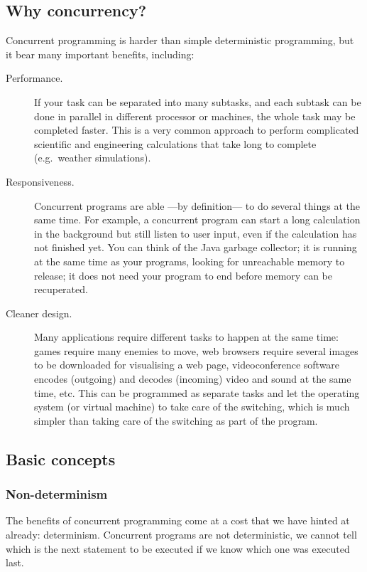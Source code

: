 \subsection{Why concurrency?}
\label{sec:why-concurrency}

Concurrent programming is harder than simple deterministic
programming, but it bear many important benefits, including: 

\begin{description}
\item[Performance. ] If your task can be separated into many subtasks,
  and each subtask can be done in parallel in different processor or
  machines, the whole task may be completed faster. This is a very
  common approach to perform complicated scientific and engineering
  calculations that take long to complete (e.g.~weather simulations).
\item[Responsiveness. ] Concurrent programs are able ---by
  definition--- to do several things at the same time. For example, a
  concurrent program can start a long calculation in the background
  but still listen to user input, even if the calculation has not
  finished yet. You can think of the Java garbage collector; it is
  running at the same time as your programs, looking for unreachable
  memory to release; it does not need your program to end before
  memory can be recuperated.
\item[Cleaner design. ] Many applications require different tasks to
  happen at the same time: games require many enemies to move, web
  browsers require several images to be downloaded for visualising a
  web page, videoconference software encodes (outgoing) and decodes
  (incoming) video and sound at the same time, etc. This can be
  programmed as separate tasks and let the operating system (or
  virtual machine) to take care of the switching, which is much
  simpler than taking care of the switching as part of the program. 
\end{description}

\subsection{Basic concepts}
\label{sec:basic-concepts}

\subsubsection{Non-determinism}
\label{sec:non-determinism}

The benefits of concurrent programming come at a cost that we have
hinted at already: determinism. Concurrent programs are not
deterministic, we cannot tell which is the next statement to be
executed if we know which one was executed last. 

